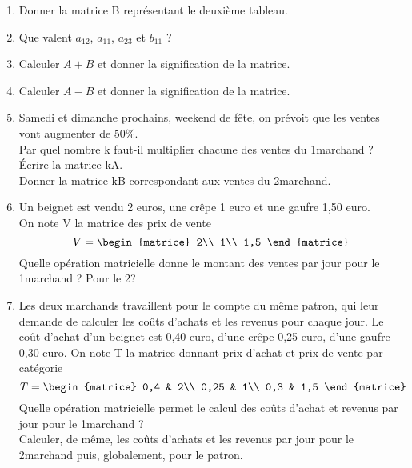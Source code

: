 \begin{exercice}
	\begin{enumerate}
		\item 	Donner la matrice B représentant le deuxième tableau.
		\item 	Que valent $a_{12}$, $a_{11}$, $a_{23}$ et $b_{11}$ ?
		\item 	Calculer $A+B$ et donner la signification de la matrice.
		\item 	Calculer $A-B$ et donner la signification de la matrice.
		\item  	Samedi et dimanche prochains, weekend de fête, on prévoit que les ventes vont augmenter de 50\%.\\
		      Par quel nombre k faut-il multiplier chacune des ventes du 1\er marchand ? \'Ecrire la matrice  kA.\\
		      Donner la matrice kB correspondant aux ventes du 2\eme marchand.
		\item 	Un beignet est vendu 2 euros, une crêpe 1 euro et une gaufre 1,50 euro.\\
		      On note V la matrice des prix de vente
		      $$V=\begin{matrice}
				      2\\
				      1\\
				      1,5
			      \end{matrice}$$
		      Quelle opération matricielle donne le montant des ventes par jour pour le 1\er marchand ? Pour le 2\eme ?
		\item 	 Les deux marchands travaillent pour le compte du même patron, qui leur demande	de calculer les coûts d’achats et les revenus pour chaque jour. Le coût d’achat d’un
		      beignet est 0,40 euro, d’une crêpe 0,25 euro, d’une gaufre 0,30 euro. On note T la matrice donnant prix d’achat et prix de vente par catégorie
		      $$T=\begin{matrice}
				      0,4 & 2\\
				      0,25 & 1\\
				      0,3 & 1,5
			      \end{matrice}$$
		      Quelle opération matricielle permet le calcul des coûts d’achat et revenus par jour
		      pour le 1\er marchand ?\\
		      Calculer, de même, les coûts d’achats et les revenus par jour pour le 2\eme marchand
		      puis, globalement, pour le patron.
	\end{enumerate}
\end{exercice}



